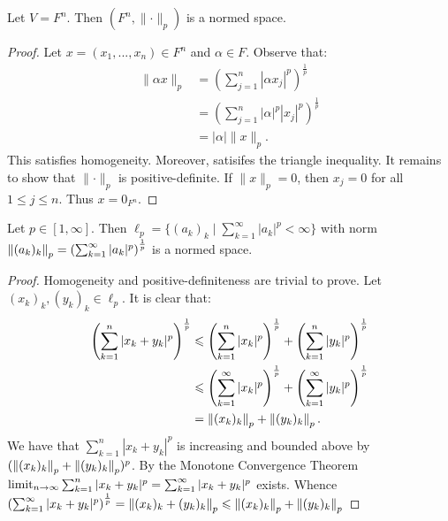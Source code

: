     \begin{theorem}
        Let $V = F^n$. Then $(F^n, \lVert \cdot \rVert _p)$ is a normed space.
    \end{theorem}
        \begin{proof}
            Let $x = (x_1,...,x_n) \in F^n$ and $\alpha \in F$. Observe that:
                \begin{equation*}
                \begin{split}
                    \lVert  \alpha x \rVert _p
                    & = \left(\sum_{j = 1}^n |\alpha x_j|^p\right)^\frac{1}{p} \\
                    & = \left(\sum_{j = 1}^n |\alpha|^p |x_j|^p\right)^\frac{1}{p} \\
                    & = |\alpha| \lVert x \rVert _p.
                \end{split}
                \end{equation*}
            This satisfies homogeneity. Moreover,  satisifes the triangle inequality. It remains to show that $\lVert \cdot \rVert _p$ is positive-definite. If $\lVert x \rVert _p = 0$, then $x_j = 0$ for all $1 \leq j \leq n$. Thus $x = 0_{F^n}$.
        \end{proof}

    \begin{corollary}
        Let $p \in [1,\infty]$. Then $\ell_p = \bigl\{(a_k)_k \mid \sum_{k = 1}^\infty |a_k|^p < \infty \bigr\}$ with norm $\left\lVert (a_k)_k \right\rVert_p = \left( \sum_{k = 1}^\infty |a_k|^p \right)^\frac{1}{p}$ is a normed space.
    \end{corollary}
        \begin{proof}
            Homogeneity and positive-definiteness are trivial to prove. Let $(x_k)_k,(y_k)_k \in \ell_p$. It is clear that:
            \begin{equation*}
                \begin{split}
                    \left(\sum_{k  =1}^n|x_k + y_k|^p\right)^{\frac{1}{p}}
                    & \leqslant \left(\sum_{k = 1}^n |x_k|^p\right)^\frac{1}{p} + \left(\sum_{k  =1}^n |y_k|^p\right)^\frac{1}{p} \\
                    & \leqslant \left(\sum_{k= 1}^\infty |x_k|^p\right)^\frac{1}{p} + \left(\sum_{k  =1}^\infty |y_k|^p\right)^\frac{1}{p} \\
                    & = \left\lVert (x_k)_k \right\rVert_p + \left\lVert (y_k)_k \right\rVert_p.
                \end{split}
                \end{equation*}
            We have that $\sum_{k = 1}^n |x_k + y_k|^p$ is increasing and bounded above by $(\left\lVert (x_k)_k \right\rVert_p + \left\lVert (y_k)_k \right\rVert_p)^p$. By the Monotone Convergence Theorem $\operatorname*{limit}_{n \rightarrow \infty}\sum_{k = 1}^n |x_k + y_k|^p = \sum_{k = 1}^\infty |x_k + y_k|^p$ exists. Whence $\left( \sum_{k = 1}^\infty |x_k + y_k|^p \right)^\frac{1}{p}  = \left\lVert (x_k)_k + (y_k)_k \right\rVert_p \leqslant \left\lVert (x_k)_k \right\rVert_p + \left\lVert (y_k)_k \right\rVert_p$
        \end{proof}

